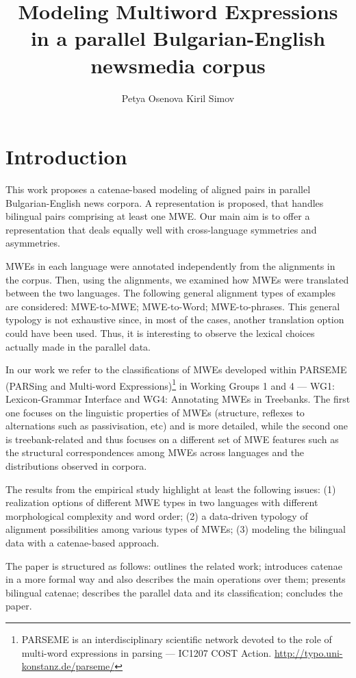 \documentclass[output=paper]{langsci/langscibook}
\author{Petya Osenova\affiliation{Linguistic Modelling Department, IICT-BAS}%
\lastand Kiril Simov\affiliation{Linguistic Modelling Department, IICT-BAS}}
\title{Modeling Multiword Expressions in a parallel Bulgarian-English newsmedia corpus}\shorttitlerunninghead{Modeling Multiword Expressions in a parallel Bulgarian-English corpus}
\begin{document}
\section{Introduction}

This work proposes a catenae-based modeling of aligned pairs in parallel \linebreak
Bulgarian-English news corpora. A representation is  proposed, that  handles bilingual pairs
comprising at least one MWE. Our main aim is to offer a representation that
deals equally well with cross-language symmetries and asymmetries.

MWEs in each language were annotated independently from the alignments in
the corpus. Then, using the alignments, we examined how MWEs were translated
between the two languages. The following general alignment types of examples
are considered: MWE-to-MWE; MWE-to-Word; MWE-to-phrases. This general
typology is not exhaustive since, in most of the cases, another translation
option could have been used. Thus, it is interesting to observe the lexical
choices actually made in the parallel data.

In our work we refer to the classifications of MWEs developed within \linebreak
PARSEME
(PARSing and Multi-word Expressions)\footnote{PARSEME is an
interdisciplinary scientific network devoted to the role of multi-word
expressions in parsing ---  IC1207 COST Action.
\url{http://typo.uni-konstanz.de/parseme/}} in Working Groups 1 and 4 ---
{WG1: Lexicon-Grammar Interface} and {WG4: Annotating MWEs in Treebanks}.
The first one focuses on the linguistic properties of MWEs (structure,
reflexes to alternations such as passivisation, etc) and is more detailed,
while the second one is treebank-related and thus focuses on a different set
of MWE features such as the structural correspondences among MWEs across
languages and the distributions observed in corpora.

The results from the empirical study highlight at least the following
issues: (1) realization options of different MWE types in two languages with
different morphological complexity and word order; (2) a data-driven
typology of alignment possibilities among various types of MWEs; (3)
modeling the bilingual data with a catenae-based approach.

The paper is structured as follows:  outlines the related
work;  introduces catenae in a more formal way and also
describes the main operations over them;   presents
bilingual catenae;   describes the parallel data and its
classification;   concludes the paper.
\end{document}
